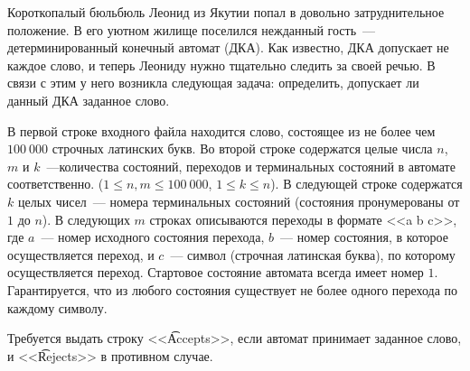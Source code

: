 Короткопалый бюльбюль Леонид из Якутии попал в довольно затруднительное
положение. В его уютном жилище поселился нежданный гость~--- детерминированный
конечный
автомат (ДКА). Как известно, ДКА допускает не каждое слово, и теперь Леониду нужно
тщательно следить за своей речью. В связи с этим у него возникла следующая задача:
определить, допускает ли данный ДКА заданное слово.

\InputFile

В первой строке входного файла находится слово, состоящее из не более чем $100\ 000$
строчных латинских букв.
Во второй строке содержатся целые числа $n$, $m$ и $k$~---количества состояний, переходов
и терминальных состояний в автомате соответственно. ($1 \le n, m \le 100\ 000$, $1 \le k \le n$).
В следующей строке содержатся $k$ целых чисел~--- номера терминальных состояний
(состояния пронумерованы от $1$ до $n$).
В следующих $m$ строках описываются переходы в формате <<a b c>>, где $a$~--- номер
исходного состояния перехода, $b$~--- номер состояния, в которое осуществляется переход,
и $c$~--- символ (строчная латинская буква), по которому осуществляется переход.
Стартовое состояние автомата всегда имеет номер $1$. Гарантируется, что из
любого состояния существует не более одного перехода по каждому символу.

\OutputFile

Требуется выдать строку <<\t{Accepts}>>, если автомат принимает заданное слово,
и <<\t{Rejects}>> в противном случае.

\SAMPLES
